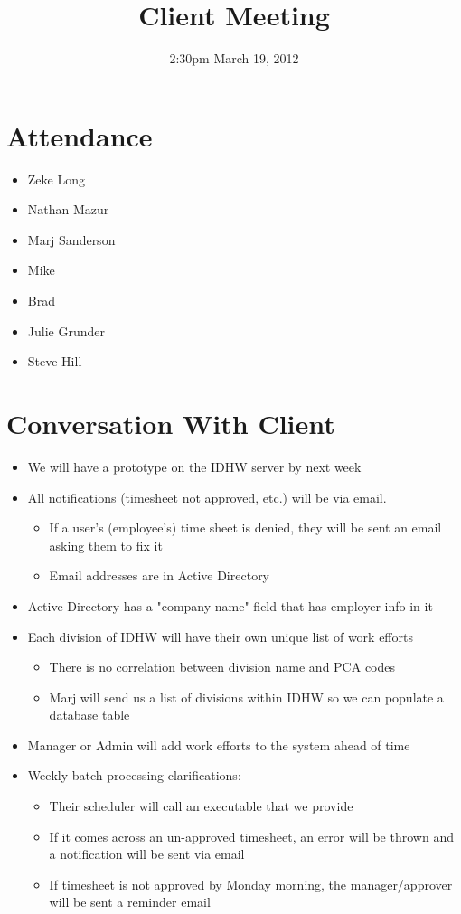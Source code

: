 \documentclass{article}
\begin{document}
\title{Client Meeting}
\date{2:30pm March 19, 2012}
\maketitle

\section{Attendance}
\begin{itemize}
\item Zeke Long
\item Nathan Mazur
\item Marj Sanderson
\item Mike
\item Brad
\item Julie Grunder
\item Steve Hill
\end{itemize}


\section{Conversation With Client}
\begin{itemize}
\item We will have a prototype on the IDHW server by next week
\item All notifications (timesheet not approved, etc.) will be via email.
\begin{itemize}
	\item If a user's (employee's) time sheet is denied, they will be sent an email asking them to fix it
	\item Email addresses are in Active Directory
\end{itemize}
\item Active Directory has a "company name" field that has employer info in it
\item Each division of IDHW will have their own unique list of work efforts
\begin{itemize}
	\item There is no correlation between division name and PCA codes
	\item Marj will send us a list of divisions within IDHW so we can populate a database table
\end{itemize}
\item Manager or Admin will add work efforts to the system ahead of time
\item Weekly batch processing clarifications:
\begin{itemize}
	\item Their scheduler will call an executable that we provide
	\item If it comes across an un-approved timesheet, an error will be thrown and a notification will be sent via email
	\item If timesheet is not approved by Monday morning, the manager/approver will be sent a reminder email
\end{itemize}

\end{itemize}
\end{document}
